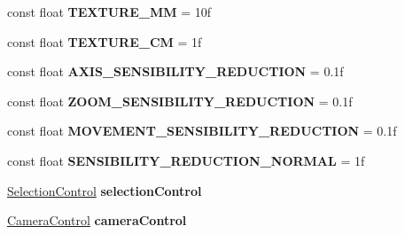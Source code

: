 \begin{DoxyCompactItemize}
const float {\bfseries T\+E\+X\+T\+U\+R\+E\+\_\+MM} = 10f
\item 
\mbox{\label{class_metric_system_control_a060ce4893c2342e3132fc62758a6e5f2}} 
const float {\bfseries T\+E\+X\+T\+U\+R\+E\+\_\+CM} = 1f
\item 
\mbox{\label{class_metric_system_control_a9db04ec2771e361c45bb0fd754ae5713}} 
const float {\bfseries A\+X\+I\+S\+\_\+\+S\+E\+N\+S\+I\+B\+I\+L\+I\+T\+Y\+\_\+\+R\+E\+D\+U\+C\+T\+I\+ON} = 0.\+1f
\item 
\mbox{\label{class_metric_system_control_a55765b790738a6a425bc7d9419768966}} 
const float {\bfseries Z\+O\+O\+M\+\_\+\+S\+E\+N\+S\+I\+B\+I\+L\+I\+T\+Y\+\_\+\+R\+E\+D\+U\+C\+T\+I\+ON} = 0.\+1f
\item 
\mbox{\label{class_metric_system_control_a09bb535f3f0dc3a0148aae3127cac3aa}} 
const float {\bfseries M\+O\+V\+E\+M\+E\+N\+T\+\_\+\+S\+E\+N\+S\+I\+B\+I\+L\+I\+T\+Y\+\_\+\+R\+E\+D\+U\+C\+T\+I\+ON} = 0.\+1f
\item 
\mbox{\label{class_metric_system_control_a96682b2e978aed50d76d421ec2e32930}} 
const float {\bfseries S\+E\+N\+S\+I\+B\+I\+L\+I\+T\+Y\+\_\+\+R\+E\+D\+U\+C\+T\+I\+O\+N\+\_\+\+N\+O\+R\+M\+AL} = 1f
\item 
\mbox{\label{class_metric_system_control_a45a8cce245251be2e23e7d2aae47148f}} 
\mbox{\hyperlink{class_selection_control}{Selection\+Control}} {\bfseries selection\+Control}
\item 
\mbox{\label{class_metric_system_control_a07ba2765128276abd787a07740080c41}} 
\mbox{\hyperlink{class_camera_control}{Camera\+Control}} {\bfseries camera\+Control}
\end{DoxyCompactItemize}


